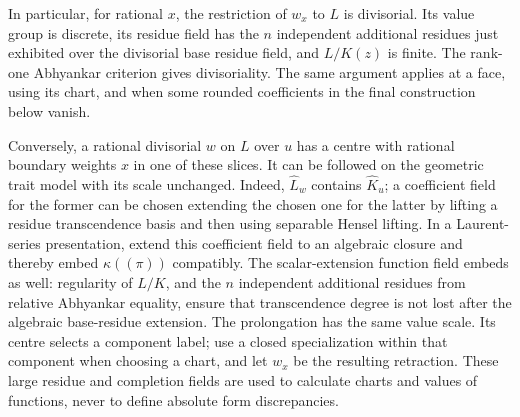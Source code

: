 In particular, for rational \(x\), the restriction of
\(w_x\) to \(L\) is divisorial.  Its value group is discrete,
its residue field has the \(n\) independent additional
residues just exhibited over the divisorial base residue
field, and \(L/K(z)\) is finite.  The rank-one Abhyankar
criterion gives divisoriality.  The same argument applies
at a face, using its chart, and when some rounded
coefficients in the final construction below vanish.

Conversely, a rational divisorial \(w\) on \(L\) over \(u\)
has a centre with rational boundary weights \(x\) in one of
these slices.  It can be followed on the geometric trait
model with its scale unchanged.  Indeed,
\(\widehat L_w\) contains \(\widehat K_u\); a coefficient
field for the former can be chosen extending the chosen
one for the latter by lifting a residue transcendence
basis and then using separable Hensel lifting.  In a
Laurent-series presentation, extend this coefficient
field to an algebraic closure and thereby embed
\(\kappa((\pi))\) compatibly.  The scalar-extension function
field embeds as well: regularity of \(L/K\), and the
\(n\) independent additional residues from relative
Abhyankar equality, ensure that transcendence degree is
not lost after the algebraic base-residue extension.
The prolongation has the same value scale.  Its centre
selects a component label; use a closed specialization
within that component when choosing a chart, and let
\(w_x\) be the resulting retraction.  These large residue
and completion fields are used to calculate charts and
values of functions, never to define absolute form
discrepancies.

